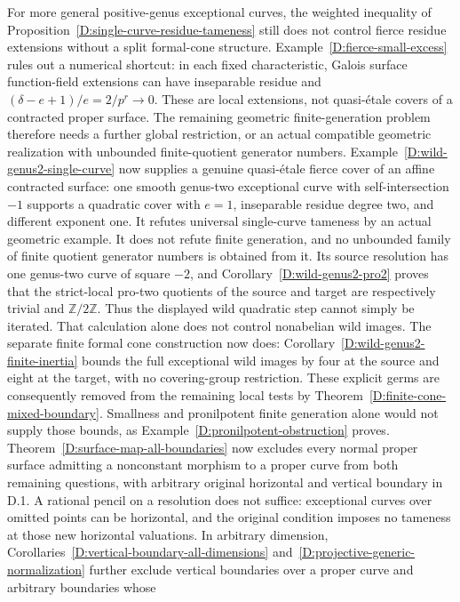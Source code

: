 \begin{remark}
For more general positive-genus exceptional curves, the
weighted inequality of
Proposition~\ref{D:single-curve-residue-tameness} still does not
control fierce residue extensions without a split formal-cone
structure.  Example~\ref{D:fierce-small-excess} rules out a
numerical shortcut: in each fixed characteristic, Galois surface
function-field extensions can have inseparable residue and
$(\delta-e+1)/e=2/p^r\to0$.  These are local extensions, not
quasi-\'etale covers of a contracted proper surface.  The
remaining geometric finite-generation problem therefore needs
a further global restriction, or an actual compatible geometric
realization with unbounded finite-quotient generator numbers.
Example~\ref{D:wild-genus2-single-curve} now supplies a genuine
quasi-\'etale fierce cover of an affine contracted surface:
one smooth genus-two exceptional curve with self-intersection
$-1$ supports a quadratic cover with $e=1$, inseparable residue
degree two, and different exponent one.  It refutes universal
single-curve tameness by an actual geometric example.
It does not refute finite generation, and no unbounded family
of finite quotient generator numbers is obtained from it.
Its source resolution has one genus-two curve of square $-2$,
and Corollary~\ref{D:wild-genus2-pro2} proves that the strict-local
pro-two quotients of the source and target are respectively
trivial and $\mathbb Z/2\mathbb Z$.  Thus the displayed wild
quadratic step cannot simply be iterated.  That calculation
alone does not control nonabelian wild images.  The separate
finite formal cone construction now does:
Corollary~\ref{D:wild-genus2-finite-inertia} bounds the full
exceptional wild images by four at the source and eight at
the target, with no covering-group restriction.  These explicit
germs are consequently removed from the remaining local tests
by Theorem~\ref{D:finite-cone-mixed-boundary}.  Smallness and
pronilpotent finite generation alone would not supply those
bounds, as Example~\ref{D:pronilpotent-obstruction} proves.
Theorem~\ref{D:surface-map-all-boundaries} now excludes every
normal proper surface admitting a nonconstant morphism to a proper
curve from both remaining questions, with arbitrary original
horizontal and vertical boundary in D.1.  A rational pencil on
a resolution does not suffice: exceptional curves over omitted
points can be horizontal, and the original condition imposes no
tameness at those new horizontal valuations.
In arbitrary dimension, Corollaries~\ref{D:vertical-boundary-all-dimensions}
and~\ref{D:projective-generic-normalization} further exclude vertical
boundaries over a proper curve and arbitrary boundaries whose

\end{remark}
